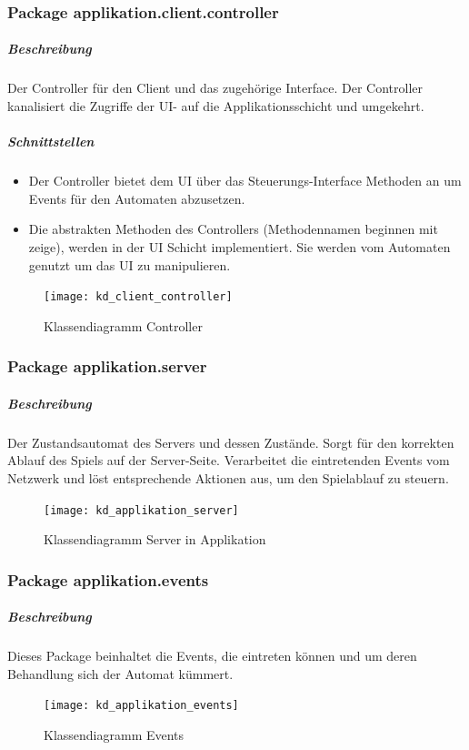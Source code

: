 \documentclass[12pt,halfparskip]{scrartcl}
\begin{document}
\subsubsection{Package applikation.client.controller}
\label{ssub:package_applikation_client}
\subparagraph{Beschreibung}
Der Controller für den Client und das zugehörige Interface. Der Controller kanalisiert die Zugriffe der UI- auf die Applikationsschicht und umgekehrt.

\subparagraph{Schnittstellen}
\begin{itemize}
	\item Der Controller bietet dem UI über das Steuerungs-Interface Methoden an um Events für den Automaten abzusetzen.
	\item Die abstrakten Methoden des Controllers (Methodennamen beginnen mit zeige), werden in der UI Schicht implementiert. Sie werden vom Automaten genutzt um das UI zu manipulieren.
\end{itemize}

\begin{figure}[h]
	\centering
	\texttt{[image: kd\_client\_controller]}
	\caption{Klassendiagramm Controller}
	\label{fig:kd_client_controller}
\end{figure}

\clearpage
\subsubsection{Package applikation.server}
\label{ssub:package_applikation_server}
\subparagraph{Beschreibung}
Der Zustandsautomat des Servers und dessen Zustände. Sorgt für den korrekten Ablauf des Spiels auf der Server-Seite. Verarbeitet die eintretenden Events vom Netzwerk und löst entsprechende Aktionen aus, um den Spielablauf zu steuern.

\begin{figure}[h]
	\centering
	\texttt{[image: kd\_applikation\_server]}
	\caption{Klassendiagramm Server in Applikation}
	\label{fig:kd_applikation_server}
\end{figure}

\clearpage
\subsubsection{Package applikation.events}
\label{ssub:package_applikation_events}
\subparagraph{Beschreibung}
Dieses Package beinhaltet die Events, die eintreten können und um deren Behandlung sich der Automat kümmert.
\begin{figure}[h]
	\centering
	\texttt{[image: kd\_applikation\_events]}
	\caption{Klassendiagramm Events}
	\label{fig:kd_applikation_events}
\end{figure}
\end{document}

